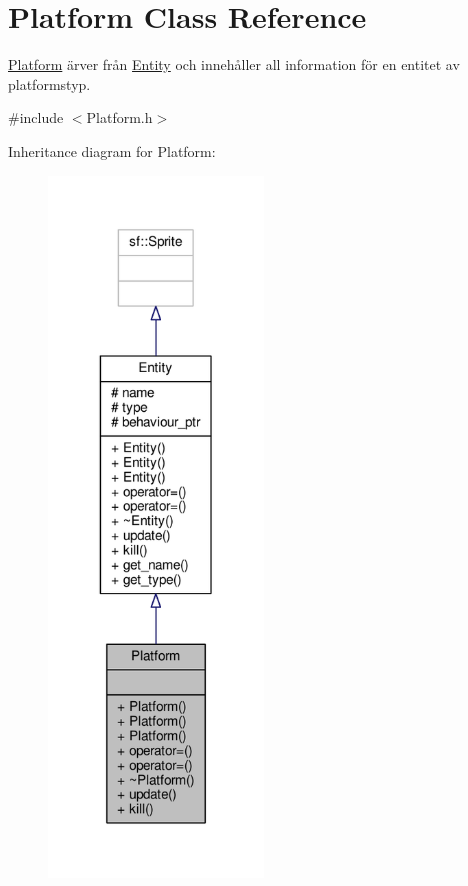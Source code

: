 \hypertarget{classPlatform}{\section{Platform Class Reference}
\label{classPlatform}
}


\hyperlink{classPlatform}{Platform} ärver från \hyperlink{classEntity}{Entity} och innehåller all information för en entitet av platformstyp.  




{\ttfamily \#include $<$Platform.\+h$>$}



Inheritance diagram for Platform\+:\nopagebreak
\begin{figure}[H]
\begin{center}
\leavevmode
\includegraphics[width=162pt]{classPlatform__inherit__graph}
\end{center}
\end{figure}


